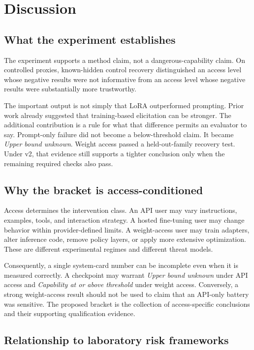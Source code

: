 \documentclass[11pt]{article}
\newcommand{\Unknown}{\textit{Upper bound unknown}}
\newcommand{\Above}{\textit{Capability at or above threshold}}
\begin{document}
\section{Discussion}

\subsection{What the experiment establishes}

The experiment supports a method claim, not a dangerous-capability claim. On controlled proxies,
known-hidden control recovery distinguished an access level whose negative results were not
informative from an access level whose negative results were substantially more trustworthy.

The important output is not simply that LoRA outperformed prompting. Prior work already suggested
that training-based elicitation can be stronger. The additional contribution is a rule for what that
difference permits an evaluator to say. Prompt-only failure did not become a below-threshold claim.
It became \Unknown. Weight access passed a held-out-family recovery test. Under v2, that evidence
still supports a tighter conclusion only when the remaining required checks also pass.

\subsection{Why the bracket is access-conditioned}

Access determines the intervention class. An API user may vary instructions, examples, tools, and
interaction strategy. A hosted fine-tuning user may change behavior within provider-defined limits.
A weight-access user may train adapters, alter inference code, remove policy layers, or apply more
extensive optimization. These are different experimental regimes and different threat models.

Consequently, a single system-card number can be incomplete even when it is measured correctly. A
checkpoint may warrant \Unknown{} under API access and \Above{} under weight access. Conversely, a
strong weight-access result should not be used to claim that an API-only battery was sensitive. The
proposed bracket is the collection of access-specific conclusions and their supporting qualification
evidence.

\subsection{Relationship to laboratory risk frameworks}
\end{document}
